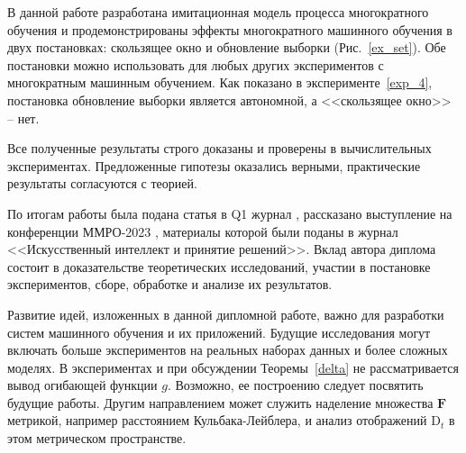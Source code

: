 В данной работе разработана имитационная модель процесса многократного обучения и продемонстрированы эффекты многократного машинного обучения в двух постановках: скользящее окно и обновление выборки (Рис.~\ref{ex_set}). Обе постановки можно использовать для любых других экспериментов с многократным машинным обучением. Как показано в эксперименте~\ref{exp_4}, постановка обновление выборки является автономной, а <<скользящее окно>> -- нет.

Все полученные результаты строго доказаны и проверены в вычислительных экспериментах. Предложенные гипотезы оказались верными, практические результаты согласуются с теорией. 

По итогам работы была подана статья в Q1 журнал \cite{veprikov2024mathematical}, рассказано выступление на конференции ММРО-2023 \cite{veprikov2023matematicheskaya}, материалы которой были поданы в журнал <<Искусственный интеллект и принятие решений>>. Вклад автора диплома состоит в доказательстве теоретических исследований, участии в постановке экспериментов, сборе, обработке и анализе их результатов.

Развитие идей, изложенных в данной дипломной работе, важно для разработки систем машинного обучения и их приложений. Будущие исследования могут включать больше экспериментов на реальных наборах данных и более сложных моделях. 
В экспериментах и при обсуждении Теоремы~\ref{delta} не рассматривается вывод огибающей функции $g$. Возможно, ее построению следует посвятить будущие работы. Другим направлением может служить наделение множества $\textbf{F}$ метрикой, например расстоянием Кульбака-Лейблера, и анализ отображений $\text{D}_t$ в этом метрическом пространстве.

